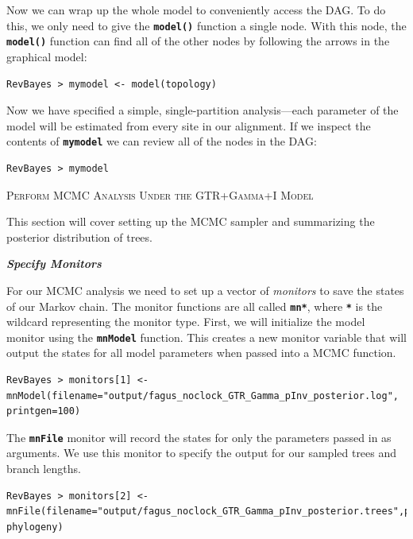 \documentclass[11pt]{article}
\newcommand{\cl}[1]{{\texttt{\textbf{#1}}}}
\begin{document}
Now we can wrap up the whole model to conveniently access the DAG. To do this, we only need to give the \cl{model()} function a single node. With this node, the \cl{model()} function can find all of the other nodes by following the arrows in the graphical model:
{\tt \begin{snugshade*}
\begin{lstlisting}
RevBayes > mymodel <- model(topology)
\end{lstlisting}
\end{snugshade*}}

Now we have specified a simple, single-partition analysis---each parameter of the model will be estimated from every site in our alignment.
If we inspect the contents of \cl{mymodel} we can review all of the nodes in the DAG:
{\tt \begin{snugshade*}
\begin{lstlisting}
RevBayes > mymodel
\end{lstlisting}
\end{snugshade*}}

\bigskip
{\large \textcolor{mycol}{\textsc{Perform MCMC Analysis Under the GTR+Gamma+I Model}}}

This section will cover setting up the MCMC sampler and summarizing the posterior distribution of trees. 

\textbf{\textit{Specify Monitors}}

For our MCMC analysis we need to set up a vector of \textit{monitors} to save the states of our Markov chain. 
The monitor functions are all called \cl{mn*}, where \cl{*} is the wildcard representing the monitor type.
First, we will initialize the model monitor using the \cl{mnModel} function. This creates a new monitor variable that will output the states for all model parameters when passed into a MCMC function. 
{\tt \begin{snugshade*}
\begin{lstlisting}
RevBayes > monitors[1] <- mnModel(filename="output/fagus_noclock_GTR_Gamma_pInv_posterior.log", printgen=100)
\end{lstlisting}
\end{snugshade*}}

The \cl{mnFile} monitor will record the states for only the parameters passed in as arguments. We use this monitor to specify the output for our sampled trees and branch lengths.

{\tt \begin{snugshade*}
\begin{lstlisting}
RevBayes > monitors[2] <- mnFile(filename="output/fagus_noclock_GTR_Gamma_pInv_posterior.trees",printgen=100, phylogeny)
\end{lstlisting}
\end{snugshade*}}
\end{document}
